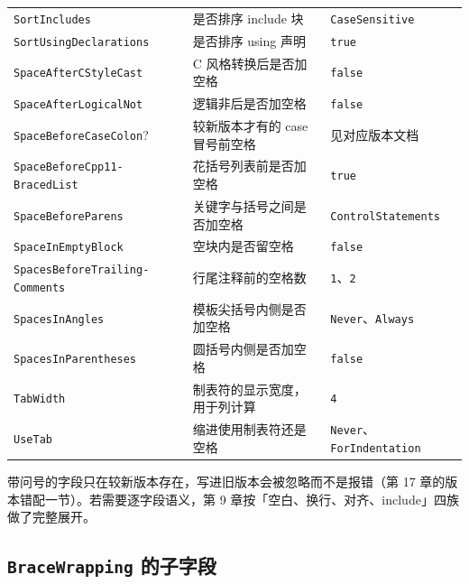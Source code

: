 \documentclass[12pt,a4paper,fontset=fandol]{ctexbook}
\begin{document}
{\begin{longtable}{@{}>{\raggedright\arraybackslash}p{}
                  >{\raggedright\arraybackslash}p{}
                  >{\raggedright\arraybackslash}p{}@{}}
\texttt{SortIncludes} & 是否排序 include 块 & \texttt{CaseSensitive} \\
\texttt{SortUsingDeclarations} & 是否排序 using 声明 & \texttt{true} \\
\texttt{SpaceAfterCStyleCast} & C 风格转换后是否加空格 & \texttt{false} \\
\texttt{SpaceAfterLogicalNot} & 逻辑非后是否加空格 & \texttt{false} \\
\texttt{SpaceBeforeCaseColon}? & 较新版本才有的 case 冒号前空格 & 见对应版本文档 \\
\texttt{SpaceBeforeCpp11-\allowbreak BracedList} & 花括号列表前是否加空格 & \texttt{true} \\
\texttt{SpaceBeforeParens} & 关键字与括号之间是否加空格 & \texttt{Control\allowbreak Statements} \\
\texttt{SpaceInEmptyBlock} & 空块内是否留空格 & \texttt{false} \\
\texttt{SpacesBeforeTrailing-\allowbreak Comments} & 行尾注释前的空格数 & \texttt{1}、\texttt{2} \\
\texttt{SpacesInAngles} & 模板尖括号内侧是否加空格 & \texttt{Never}、\texttt{Always} \\
\texttt{SpacesInParentheses} & 圆括号内侧是否加空格 & \texttt{false} \\
\texttt{TabWidth} & 制表符的显示宽度，用于列计算 & \texttt{4} \\
\texttt{UseTab} & 缩进使用制表符还是空格 & \texttt{Never}、\texttt{ForIndentation} \\
\end{longtable}
}

带问号的字段只在较新版本存在，写进旧版本会被忽略而不是报错（第 17 章的版本错配一节）。若需要逐字段语义，第 9 章按「空白、换行、对齐、include」四族做了完整展开。

\subsection{\texttt{BraceWrapping} 的子字段}\label{sec:appA-s2}
\end{document}
